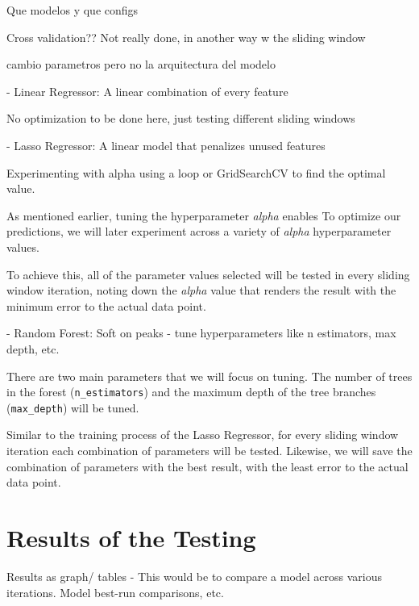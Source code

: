 \documentclass[12pt]{report} %
\begin{document}
Que modelos y que configs

Cross validation?? Not really done, in another way w the sliding window

cambio parametros pero no la arquitectura del modelo



- Linear Regressor: A linear combination of every feature

No optimization to be done here, just testing different sliding windows

- Lasso Regressor: A linear model that penalizes unused features

Experimenting with alpha using a loop or GridSearchCV to find the optimal value.


As mentioned earlier, tuning the hyperparameter \textit{alpha} enables To optimize our predictions, we will later experiment across a variety of \textit{alpha} hyperparameter values.

To achieve this, all of the parameter values selected will be tested in every sliding window iteration, noting down the \textit{alpha} value that renders the result with the minimum error to the actual data point.


- Random Forest: Soft on peaks - tune hyperparameters like n estimators, max depth, etc.

There are two main parameters that we will focus on tuning. The number of trees in the forest (\small{\verb|n_estimators|}) and the maximum depth of the tree branches (\small{\verb|max_depth|}) will be tuned.

Similar to the training process of the Lasso Regressor, for every sliding window iteration each combination of parameters will be tested. Likewise, we will save the combination of parameters with the best result, with the least error to the actual data point.


\section{Results of the Testing}
Results as graph/ tables - This would be to compare a model across various iterations. Model best-run comparisons, etc.
\end{document}
